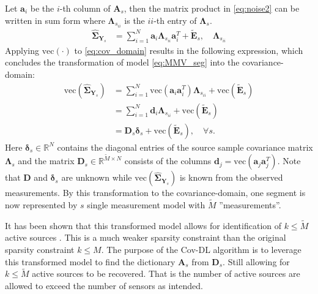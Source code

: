 Let $\mathbf{a}_i$ be the $i$-th column of $\mathbf{A}_s$, then the matrix product in \eqref{eq:noise2} can be written in sum form where $\boldsymbol{\Lambda}_{s_{ii}}$ is the $ii$-th entry of $\boldsymbol{\Lambda}_s$. 
\begin{align}
\widehat{\boldsymbol{\Sigma}}_{\mathbf{Y}_s} &= \sum_{i=1}^{N} \mathbf{a}_i \boldsymbol{\Lambda}_{s_{ii}} \mathbf{a}_i^{T} + \widetilde{\mathbf{E}}_s, \quad \boldsymbol{\Lambda}_{s_{ii}} \label{eq:cov_domain}
\end{align}
Applying $\text{vec}(\cdot)$ to \eqref{eq:cov_domain} results in the following expression, which concludes the transformation of model \eqref{eq:MMV_seg} into the covariance-domain: 
\begin{align}
\text{vec} \left(\widehat{\boldsymbol{\Sigma}}_{\mathbf{Y}_s} \right) &= \sum_{i=1}^N \text{vec}\left(\mathbf{a}_i \mathbf{a}_i^T\right) \boldsymbol{\Lambda}_{s_{ii}} + \text{vec}\left(\widetilde{\mathbf{E}}_s\right) \nonumber \\
&= \sum_{i=1}^N \mathbf{d}_i \boldsymbol{\Lambda}_{s_{ii}} + \text{vec}\left(\widetilde{\mathbf{E}}_s\right) \nonumber \\
&= \mathbf{D}_s \boldsymbol{\delta}_s + \text{vec}\left(\widetilde{\mathbf{E}}_s\right), \quad \forall s. \label{eq:cov1}
\end{align}
Here $\boldsymbol{\delta}_s \in \mathbb{R}^{N}$ contains the diagonal entries of the source sample covariance matrix $\boldsymbol{\Lambda}_s$ and the matrix $\mathbf{D}_s \in \mathbb{R}^{\widetilde{M} \times N}$ consists of the columns $\mathbf{d}_j = \text{vec}\left(\mathbf{a}_j \mathbf{a}_j^T\right)$. 
Note that $\mathbf{D}$ and $\boldsymbol{\delta}_s$ are unknown while $\text{vec}\left( \widehat{\boldsymbol{\Sigma}}_{\mathbf{Y}_s}\right)$ is known from the observed measurements.
By this transformation to the covariance-domain, one segment is now represented by $s$ single measurement model with $\widetilde{M}$ ''measurements''. 

It has been shown that this transformed model allows for identification of $k \leq \widetilde{M}$ active sources \cite{Pal2015}. This is a much weaker sparsity constraint than the original sparsity constraint $k \leq M$. 
The purpose of the Cov-DL algorithm is to leverage this transformed model to find the dictionary $\mathbf{A}_s$ from $\mathbf{D}_s$. Still allowing for $k \leq \widetilde{M}$ active sources to be recovered. 
That is the number of active sources are allowed to exceed the number of sensors as intended.

